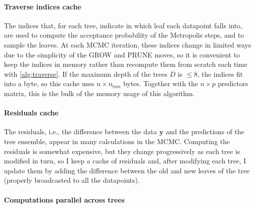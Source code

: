 \documentclass{article}
\begin{document}
    \paragraph{Traverse indices cache}

    The indices that, for each tree, indicate in which leaf each datapoint falls into, are used to compute the acceptance probability of the Metropolis steps, and to sample the leaves. At each MCMC iteration, these indices change in limited ways due to the simplicity of the GROW and PRUNE moves, so it is convenient to keep the indices in memory rather than recompute them from scratch each time with \autoref{alg:traverse}. If the maximum depth of the trees $D$ is $\le 8$, the indices fit into a byte, so this cache uses $n \times n_\text{tree}$ bytes. Together with the $n\times p$ predictors matrix, this is the bulk of the memory usage of this algorithm.

    \paragraph{Residuals cache}

    The residuals, i.e., the difference between the data $\mathbf y$ and the predictions of the tree ensemble, appear in many calculations in the MCMC. Computing the residuals is somewhat expensive, but they change progressively as each tree is modified in turn, so I keep a cache of residuals and, after modifying each tree, I update them by adding the difference between the old and new leaves of the tree (properly broadcasted to all the datapoints).

    \paragraph{Computations parallel across trees}
\end{document}
